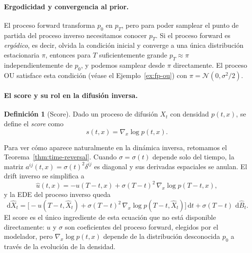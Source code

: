 \documentclass[12pt, a4paper]{report}
\theoremstyle{plain}
\theoremstyle{definition}
\newtheorem{definition}[theorem]{Definición}
\theoremstyle{remark}
\newcommand{\dd}{\,\mathrm{d}}
\begin{document}
\paragraph{Ergodicidad y convergencia al prior.}

El proceso forward transforma $p_0$ en $p_T$, pero para poder samplear el punto de partida del proceso inverso necesitamos conocer $p_T$. Si el proceso forward es \emph{ergódico}, es decir, olvida la condición inicial y converge a una única distribución estacionaria $\pi$, entonces para $T$ suficientemente grande $p_T \approx \pi$ independientemente de $p_0$, y podemos samplear desde $\pi$ directamente. El proceso OU satisface esta condición (véase el Ejemplo~\ref{ex:fp-ou}) con $\pi = \mathcal{N}(0,\sigma^2/2)$.

\paragraph{El score y su rol en la difusión inversa.}

\begin{definition}[Score]
\label{def:score}
Dado un proceso de difusión $X_t$ con densidad $p(t,x)$, se define el \emph{score} como
\[
  s(t,x) = \nabla_x \log p(t,x).
\]
\end{definition}

Para ver cómo aparece naturalmente en la dinámica inversa, retomamos el Teorema~\ref{thm:time-reversal}. Cuando $\sigma = \sigma(t)$ depende solo del tiempo, la matriz $a^{ij}(t,x) = \sigma(t)^2\delta^{ij}$ es diagonal y sus derivadas espaciales se anulan. El drift inverso se simplifica a
\[
  \hat{u}(t,x) = -u(T-t,x) + \sigma(T-t)^2\,\nabla_x\log p(T-t,x),
\]
y la EDE del proceso inverso queda
\begin{equation}
  \dd\hat{X}_t = \bigl[-u(T-t,\hat{X}_t) + \sigma(T-t)^2\,\nabla_x\log p(T-t,\hat{X}_t)\bigr]\dd t
  + \sigma(T-t)\,\dd\hat{B}_t.
  \label{eq:reverse-score}
\end{equation}
El score es el único ingrediente de esta ecuación que no está disponible directamente: $u$ y $\sigma$ son coeficientes del proceso forward, elegidos por el modelador, pero $\nabla_x \log p(t,x)$ depende de la distribución desconocida $p_0$ a través de la evolución de la densidad.
\end{document}
